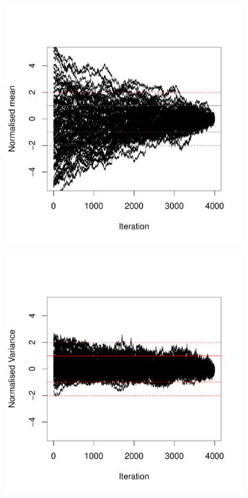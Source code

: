 \begin{figure}[H]
    \centering
    \begin{subfigure}[t]{0.45\textwidth}
    \centering
        \includegraphics[width=\textwidth]{background/Figures/BHM/AllMeanParticles.pdf}
        \caption{}
    \end{subfigure}
    \begin{subfigure}[t]{0.45\textwidth}
    \centering
      \includegraphics[width=\textwidth]{background/Figures/BHM/AllVarParticles.pdf}

\end{subfigure}
\end{figure}
